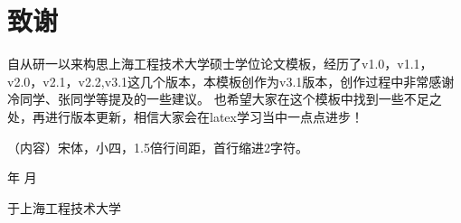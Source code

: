 \chapter{致谢}
自从研一以来构思上海工程技术大学硕士学位论文模板，经历了v1.0，v1.1，v2.0，v2.1，v2.2,v3.1这几个版本，本模板创作为v3.1版本，创作过程中非常感谢冷同学、张同学等提及的一些建议。
也希望大家在这个模板中找到一些不足之处，再进行版本更新，相信大家会在latex学习当中一点点进步！

（内容）宋体，小四，1.5倍行间距，首行缩进2字符。

\begin{flushright}
    \number\year    年 \number\month  月
    
    于上海工程技术大学
\end{flushright}


